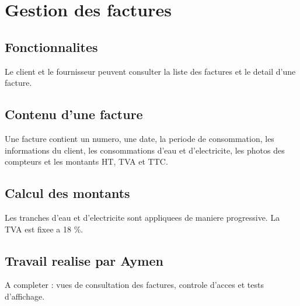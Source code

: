 \section{Gestion des factures}

\subsection{Fonctionnalites}

Le client et le fournisseur peuvent consulter la liste des factures et le detail d'une facture.

\subsection{Contenu d'une facture}

Une facture contient un numero, une date, la periode de consommation, les informations du client, les consommations d'eau et d'electricite, les photos des compteurs et les montants HT, TVA et TTC.

\subsection{Calcul des montants}

Les tranches d'eau et d'electricite sont appliquees de maniere progressive. La TVA est fixee a 18 \%.

\subsection{Travail realise par Aymen}

A completer : vues de consultation des factures, controle d'acces et tests d'affichage.
